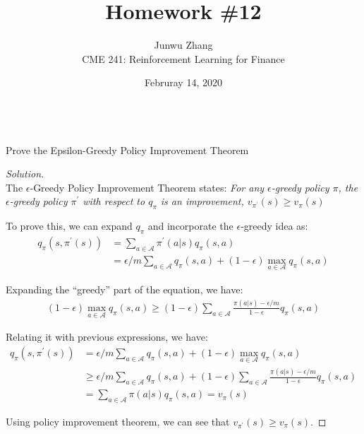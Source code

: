 \documentclass[12pt]{article}
\date{Februray 14, 2020}
\newenvironment{problem}[2][Problem]{\begin{trivlist}
\item[\hskip \labelsep {\bfseries #1}\hskip \labelsep {\bfseries #2.}]}{\end{trivlist}}
\newenvironment{solution}
  {\renewcommand\qedsymbol{$\blacksquare$}\begin{proof}[Solution]}
  {\end{proof}}
\begin{document}
 
\title{Homework \#12}
\author{Junwu Zhang\\ 
CME 241: Reinforcement Learning for Finance \\}
\maketitle

\begin{problem}{1}
\text{ }\\
Prove the Epsilon-Greedy Policy Improvement Theorem
\end{problem}
\begin{solution}
\text{ }\\

The $\epsilon$-Greedy Policy Improvement Theorem states:
\textit{For any $\epsilon$-greedy policy $\pi$, the $\epsilon$-greedy policy $\pi^\prime$ with respect to $q_\pi$ is an improvement, $v_{\pi^{\prime}}(s) \geq v_{\pi}(s)$}

To prove this, we can expand $q_\pi$ and incorporate the $\epsilon$-greedy idea as:
\begin{equation}
\begin{aligned}
q_{\pi}\left(s, \pi^{\prime}(s)\right) &=\sum_{a \in \mathcal{A}} \pi^{\prime}(a | s) q_{\pi}(s, a) \\
&=\epsilon / m \sum_{a \in \mathcal{A}} q_{\pi}(s, a)+(1-\epsilon) \max _{a \in \mathcal{A}} q_{\pi}(s, a)
\end{aligned}
\end{equation}

Expanding the ``greedy'' part of the equation, we have:
\begin{equation}
\begin{aligned}
(1-\epsilon) \max _{a \in \mathcal{A}} q_{\pi}(s, a) \geq (1-\epsilon) \sum_{a \in \mathcal{A}} \frac{\pi(a | s)-\epsilon / m}{1-\epsilon} q_{\pi}(s, a)
\end{aligned}
\end{equation}

Relating it with previous expressions, we have:
\begin{equation}
\begin{aligned}
q_{\pi}\left(s, \pi^{\prime}(s)\right) 
&=\epsilon / m \sum_{a \in \mathcal{A}} q_{\pi}(s, a)+(1-\epsilon) \max _{a \in \mathcal{A}} q_{\pi}(s, a) \\
& \geq \epsilon / m \sum_{a \in \mathcal{A}} q_{\pi}(s, a)+(1-\epsilon) \sum_{a \in \mathcal{A}} \frac{\pi(a | s)-\epsilon / m}{1-\epsilon} q_{\pi}(s, a) \\
&=\sum_{a \in \mathcal{A}} \pi(a | s) q_{\pi}(s, a)=v_{\pi}(s)
\end{aligned}
\end{equation}

Using policy improvement theorem, we can see that $v_{\pi^{\prime}}(s) \geq v_{\pi}(s)$.	
\end{solution}
\end{document}

